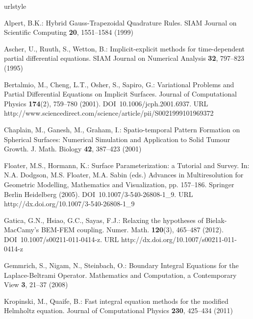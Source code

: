 \begin{thebibliography}{10}
\providecommand{\url}[1]{{#1}}
\providecommand{\urlprefix}{URL }
\expandafter\ifx\csname urlstyle\endcsname\relax
  \providecommand{\doi}[1]{DOI~\discretionary{}{}{}#1}\else
  \providecommand{\doi}{DOI~\discretionary{}{}{}\begingroup
  \urlstyle{rm}\Url}\fi

Alpert, B.K.: {Hybrid Gauss-Trapezoidal Quadrature Rules}.
\newblock SIAM Journal on Scientific Computing \textbf{20}, 1551--1584 (1999)

Ascher, U., Ruuth, S., Wetton, B.: Implicit-explicit methods for time-dependent
  partial differential equations.
\newblock SIAM Journal on Numerical Analysis \textbf{32}, 797--823 (1995)

Bertalmio, M., Cheng, L.T., Osher, S., Sapiro, G.: {Variational Problems and
  Partial Differential Equations on Implicit Surfaces}.
\newblock Journal of Computational Physics \textbf{174}(2), 759--780 (2001).
\newblock \doi{10.1006/jcph.2001.6937}.
\newblock
  \urlprefix\url{http://www.sciencedirect.com/science/article/pii/S0021999101969372}

Chaplain, M., Ganesh, M., Graham, I.: {Spatio-temporal Pattern Formation on
  Spherical Surfaces: Numerical Simulation and Application to Solid Tumour
  Growth}.
\newblock J. Math. Biology \textbf{42}, 387--423 (2001)

Floater, M.S., Hormann, K.: {Surface Parameterization: a Tutorial and Survey}.
\newblock In: N.A. Dodgson, M.S. Floater, M.A. Sabin (eds.) Advances in
  Multiresolution for Geometric Modelling, Mathematics and Visualization, pp.
  157--186. Springer Berlin Heidelberg (2005).
\newblock \doi{10.1007/3-540-26808-1\_9}.
\newblock \urlprefix\url{http://dx.doi.org/10.1007/3-540-26808-1\_9}

Gatica, G.N., Hsiao, G.C., Sayas, F.J.: Relaxing the hypotheses of
  {B}ielak-{M}ac{C}amy's {BEM}-{FEM} coupling.
\newblock Numer. Math. \textbf{120}(3), 465--487 (2012).
\newblock \doi{10.1007/s00211-011-0414-z}.
\newblock \urlprefix\url{http://dx.doi.org/10.1007/s00211-011-0414-z}

Gemmrich, S., Nigam, N., Steinbach, O.: {B}oundary {I}ntegral {E}quations for
  the {L}aplace-{B}eltrami {O}perator.
\newblock Mathematics and Computation, a Contemporary View \textbf{3}, 21--37
  (2008)

Kropinski, M., Quaife, B.: Fast integral equation methods for the modified
  {H}elmholtz equation.
\newblock Journal of Computational Physics \textbf{230}, 425--434 (2011)


\end{thebibliography}
